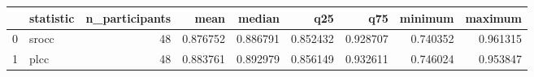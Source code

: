 \begin{tabular}{llrrrrrrr}
\toprule
 & statistic & n_participants & mean & median & q25 & q75 & minimum & maximum \\
\midrule
0 & srocc & 48 & 0.876752 & 0.886791 & 0.852432 & 0.928707 & 0.740352 & 0.961315 \\
1 & plcc & 48 & 0.883761 & 0.892979 & 0.856149 & 0.932611 & 0.746024 & 0.953847 \\
\bottomrule
\end{tabular}
